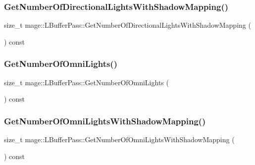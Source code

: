\subsubsection{\texorpdfstring{Get\+Number\+Of\+Directional\+Lights\+With\+Shadow\+Mapping()}{GetNumberOfDirectionalLightsWithShadowMapping()}}
{\footnotesize\ttfamily size\+\_\+t mage\+::\+L\+Buffer\+Pass\+::\+Get\+Number\+Of\+Directional\+Lights\+With\+Shadow\+Mapping (\begin{DoxyParamCaption}{ }\end{DoxyParamCaption}) const\hspace{0.3cm}{\ttfamily [noexcept]}}

\hypertarget{structmage_1_1_l_buffer_pass_a36adecea35365ec4ecc97698de68463c}{}\label{structmage_1_1_l_buffer_pass_a36adecea35365ec4ecc97698de68463c} 
\subsubsection{\texorpdfstring{Get\+Number\+Of\+Omni\+Lights()}{GetNumberOfOmniLights()}}
{\footnotesize\ttfamily size\+\_\+t mage\+::\+L\+Buffer\+Pass\+::\+Get\+Number\+Of\+Omni\+Lights (\begin{DoxyParamCaption}{ }\end{DoxyParamCaption}) const\hspace{0.3cm}{\ttfamily [noexcept]}}

\hypertarget{structmage_1_1_l_buffer_pass_a1efc71062a28fb33474e4ea9a05e9e34}{}\label{structmage_1_1_l_buffer_pass_a1efc71062a28fb33474e4ea9a05e9e34} 
\subsubsection{\texorpdfstring{Get\+Number\+Of\+Omni\+Lights\+With\+Shadow\+Mapping()}{GetNumberOfOmniLightsWithShadowMapping()}}
{\footnotesize\ttfamily size\+\_\+t mage\+::\+L\+Buffer\+Pass\+::\+Get\+Number\+Of\+Omni\+Lights\+With\+Shadow\+Mapping (\begin{DoxyParamCaption}{ }\end{DoxyParamCaption}) const\hspace{0.3cm}{\ttfamily [noexcept]}}

